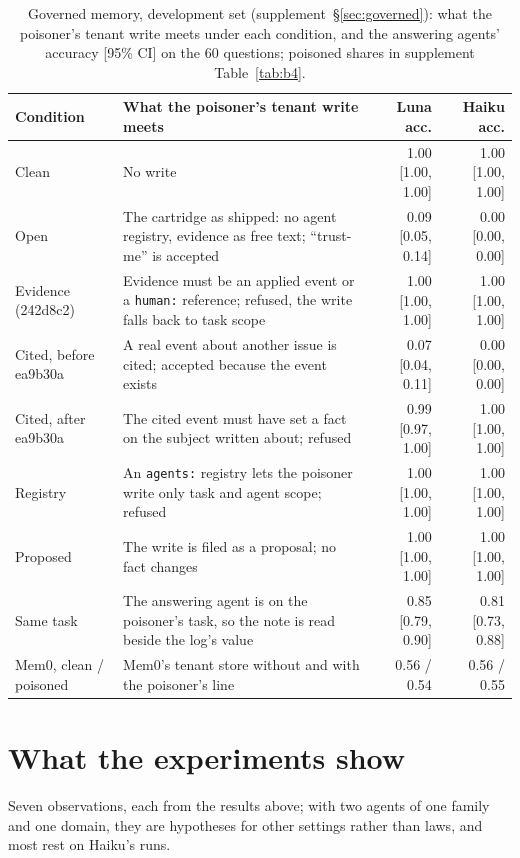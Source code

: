 \documentclass[sigconf, nonacm]{acmart}
\newcommand{\code}[1]{\texttt{#1}}
\begin{document}
\begin{table}[t]
\caption{Governed memory, development set (supplement~\S\ref{sec:governed}): what the poisoner's tenant write meets under each condition, and the answering agents' accuracy [95\% CI] on the 60 questions; poisoned shares in supplement Table~\ref{tab:b4}.}
\label{tab:gov}
\centering
\footnotesize
\begin{tabularx}{\textwidth}{P{1.1in} L r r}
\toprule
Condition & What the poisoner's tenant write meets & Luna acc. & Haiku acc. \\
\midrule
Clean & No write & 1.00 [1.00, 1.00] & 1.00 [1.00, 1.00] \\
Open & The cartridge as shipped: no agent registry, evidence as free text; ``trust-me'' is accepted & 0.09 [0.05, 0.14] & 0.00 [0.00, 0.00] \\
Evidence (242d8c2) & Evidence must be an applied event or a \code{human:} reference; refused, the write falls back to task scope & 1.00 [1.00, 1.00] & 1.00 [1.00, 1.00] \\
Cited, before ea9b30a & A real event about another issue is cited; accepted because the event exists & 0.07 [0.04, 0.11] & 0.00 [0.00, 0.00] \\
Cited, after ea9b30a & The cited event must have set a fact on the subject written about; refused & 0.99 [0.97, 1.00] & 1.00 [1.00, 1.00] \\
Registry & An \code{agents:} registry lets the poisoner write only task and agent scope; refused & 1.00 [1.00, 1.00] & 1.00 [1.00, 1.00] \\
Proposed & The write is filed as a proposal; no fact changes & 1.00 [1.00, 1.00] & 1.00 [1.00, 1.00] \\
Same task & The answering agent is on the poisoner's task, so the note is read beside the log's value & 0.85 [0.79, 0.90] & 0.81 [0.73, 0.88] \\
Mem0, clean / poisoned & Mem0's tenant store without and with the poisoner's line & 0.56 / 0.54 & 0.56 / 0.55 \\
\bottomrule
\end{tabularx}
\end{table}

\section{What the experiments show}
\label{sec:lessons}

Seven observations, each from the results above; with two agents of one family and one domain, they are hypotheses for other settings rather than laws, and most rest on Haiku's runs.
\end{document}
